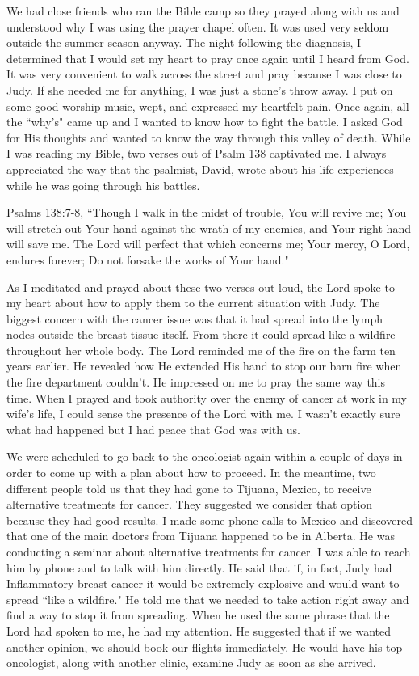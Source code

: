 \documentclass[oneside]{book}
\begin{document}
We had close friends who ran the Bible camp so they prayed along with us and understood why I was using the prayer chapel often. It was used very seldom outside the summer season anyway. The night following the diagnosis, I determined that I would set my heart to pray once again until I heard from God. It was very convenient to walk across the street and pray because I was close to Judy. If she needed me for anything, I was just a stone's throw away. I put on some good worship music, wept, and expressed my heartfelt pain. Once again, all the ``why's" came up and I wanted to know how to fight the battle. I asked God for His thoughts and wanted to know the way through this valley of death. While I was reading my Bible, two verses out of Psalm 138 captivated me. I always appreciated the way that the psalmist, David, wrote about his life experiences while he was going through his battles.

Psalms 138:7-8, ``Though I walk in the midst of trouble, You will revive me; You will stretch out Your hand against the wrath of my enemies, and Your right hand will save me. The Lord will perfect that which concerns me; Your mercy, O Lord, endures forever; Do not forsake the works of Your hand."

As I meditated and prayed about these two verses out loud, the Lord spoke to my heart about how to apply them to the current situation with Judy. The biggest concern with the cancer issue was that it had spread into the lymph nodes outside the breast tissue itself. From there it could spread like a wildfire throughout her whole body. The Lord reminded me of the fire on the farm ten years earlier. He revealed how He extended His hand to stop our barn fire when the fire department couldn't. He impressed on me to pray the same way this time. When I prayed and took authority over the enemy of cancer at work in my wife's life, I could sense the presence of the Lord with me. I wasn't exactly sure what had happened but I had peace that God was with us.

We were scheduled to go back to the oncologist again within a couple of days in order to come up with a plan about how to proceed. In the meantime, two different people told us that they had gone to Tijuana, Mexico, to receive alternative treatments for cancer. They suggested we consider that option because they had good results. I made some phone calls to Mexico and discovered that one of the main doctors from Tijuana happened to be in Alberta. He was conducting a seminar about alternative treatments for cancer. I was able to reach him by phone and to talk with him directly. He said that if, in fact, Judy had Inflammatory breast cancer it would be extremely explosive and would want to spread ``like a wildfire." He told me that we needed to take action right away and find a way to stop it from spreading. When he used the same phrase that the Lord had spoken to me, he had my attention. He suggested that if we wanted another opinion, we should book our flights immediately. He would have his top oncologist, along with another clinic, examine Judy as soon as she arrived. 
\end{document}

